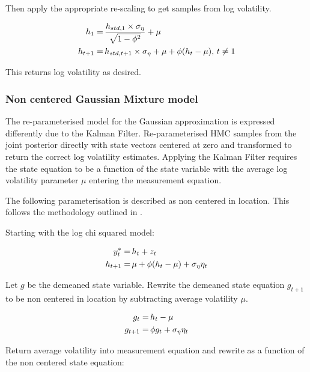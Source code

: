 \documentclass[12pt, a4paper]{article}
\begin{document}
        Then apply the appropriate re-scaling to get samples from log volatility. 
        
        $$
        \begin{aligned}
        h_1 =& \space \,\frac{h_{std, 1}\times \sigma_{\eta}} {\sqrt{1 - \phi^2}} + \mu \\
        h_{t+1} =& \space \,h_{std, t+1}\times \sigma_{\eta} + \mu  + \phi(h_{t} - \mu),\space \, t\neq 1
        \end{aligned}
        $$
        
        This returns log volatility as desired.
        
        \subsubsection{Non centered Gaussian Mixture model}
        The re-parameterised model for the Gaussian approximation is expressed differently due to the Kalman Filter. Re-parameterised HMC samples from the joint posterior directly with state vectors centered at zero and transformed to return the correct log volatility estimates. Applying the Kalman Filter requires the state equation to be a function of the state variable with the average log volatility parameter $\mu$ entering the measurement equation.

        The following parameterisation is described as non centered in location. This follows the methodology outlined in \citet{strickland2008parameterisation}.
        
        Starting with the log chi squared model:

        $$
        \begin{aligned}
        y^{\ast}_t =& \space \, h_t + z_t \\
        h_{t+1} =& \space \, \mu +\phi(h_t - \mu) + \sigma_{\eta} \eta_t
        \end{aligned}
        $$
        

        Let $g$ be the demeaned state variable. Rewrite the demeaned state equation $g_{t+1}$ to be non centered in location by subtracting average volatility $\mu$.

        $$
        \begin{aligned}
        g_t =& \space \, h_t - \mu \\
        g_{t+1} =& \space \, \phi g_t + \sigma_{\eta}\eta_{t}
        \end{aligned}
        $$

        Return average volatility into measurement equation and rewrite as a function of the non centered state equation:
\end{document}
